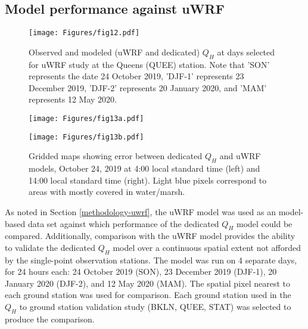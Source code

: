 \FloatBarrier

\subsection{Model performance against uWRF}

\begin{figure}[!h]
    \centering
        \texttt{[image: Figures/fig12.pdf]}
        \caption{Observed and modeled (uWRF and dedicated) $Q_H$ at days selected for uWRF study at the Queens (QUEE) station. Note that 'SON' represents the date 24 October 2019, 'DJF-1' represents 23 December 2019, 'DJF-2' represents 20 January 2020, and 'MAM' represents 12 May 2020.}
    \label{fig:wrf-timeseries}
\end{figure}

\begin{figure}[!h]
    \centering
    \begin{minipage}{0.455\textwidth}
        \centering
        \texttt{[image: Figures/fig13a.pdf]} %
    \end{minipage}\hfill
    \begin{minipage}{0.545\textwidth}
        \centering
        \texttt{[image: Figures/fig13b.pdf]} %
    \end{minipage}\hfill
    \caption{Gridded maps showing error between dedicated $Q_H$ and uWRF models, October 24, 2019 at 4:00 local standard time (left) and 14:00 local standard time (right). Light blue pixels correspond to areas with mostly covered in water/marsh.}
    \label{fig:wrf-meshgrid}
\end{figure}

As noted in Section \ref{methodology-uwrf}, the uWRF model was used as an model-based data set against which performance of the dedicated $Q_H$ model could be compared. Additionally, comparison with the uWRF model provides the ability to validate the dedicated $Q_H$ model over a continuous spatial extent not afforded by the single-point observation stations. The model was run on 4 separate days, for 24 hours each: 24 October 2019 (SON), 23 December 2019 (DJF-1), 20 January 2020 (DJF-2), and 12 May 2020 (MAM). The spatial pixel nearest to each ground station was used for comparison. Each ground station used in the $Q_H$ to ground station validation study (BKLN, QUEE, STAT) was selected to produce the comparison.

